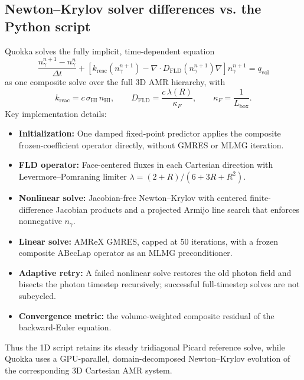 \documentclass[11pt]{article}
\begin{document}
\subsection*{Newton--Krylov solver differences vs. the Python script}
Quokka solves the fully implicit, time-dependent equation
\[
\frac{n_\gamma^{n+1}-n_\gamma^n}{\Delta t}
+\left[k_{\mathrm{reac}}(n_\gamma^{n+1})-\nabla\!\cdot D_{\mathrm{FLD}}(n_\gamma^{n+1})\nabla\right]n_\gamma^{n+1}=q_{\mathrm{vol}}
\]
as one composite solve over the full 3D AMR hierarchy, with
\[
k_{\mathrm{reac}} = c\,\sigma_{\mathrm{HI}}\,n_{\mathrm{HI}},
\qquad
D_{\mathrm{FLD}} = \frac{c\,\lambda(R)}{\kappa_F},
\qquad
\kappa_F = \frac{1}{L_{\mathrm{box}}}.
\]
Key implementation details:
\begin{itemize}
\item \textbf{Initialization:} One damped fixed-point predictor applies the composite frozen-coefficient operator directly, without GMRES or MLMG iteration.
\item \textbf{FLD operator:} Face-centered fluxes in each Cartesian direction with Levermore--Pomraning limiter
$\lambda=(2+R)/(6+3R+R^2)$.
\item \textbf{Nonlinear solve:} Jacobian-free Newton--Krylov with centered finite-difference Jacobian products and a projected Armijo line search that enforces nonnegative $n_\gamma$.
\item \textbf{Linear solve:} AMReX GMRES, capped at 50 iterations, with a frozen composite $\mathrm{ABecLap}$ operator as an MLMG preconditioner.
\item \textbf{Adaptive retry:} A failed nonlinear solve restores the old photon field and bisects the photon timestep recursively; successful full-timestep solves are not subcycled.
\item \textbf{Convergence metric:} the volume-weighted composite residual of the backward-Euler equation.
\end{itemize}
Thus the 1D script retains its steady tridiagonal Picard reference solve, while Quokka uses a GPU-parallel, domain-decomposed Newton--Krylov evolution of the corresponding 3D Cartesian AMR system.
\end{document}
